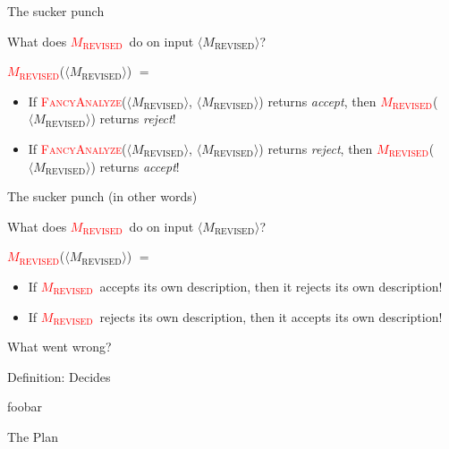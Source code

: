 \documentclass[12pt,compress]{beamer}
\newcommand{\func}[1]{\textcolor{red}{\textsc{#1}}}
\newcommand{\MREV}[0]{\func{$M_{\text{REVISED}}$}}
\newcommand{\strMREV}[0]{$\langle M_{\text{REVISED}} \rangle$}
\begin{document}
\begin{frame}{The sucker punch}

  What does \MREV~do on input \strMREV?

  \vskip 0.25in

  \MREV(\strMREV) $=$

  \begin{itemize}

  \item If \func{FancyAnalyze}(\strMREV, \strMREV) returns \textit{accept}, then
    \MREV(\strMREV) returns \textit{reject}!

  \item If \func{FancyAnalyze}(\strMREV, \strMREV) returns \textit{reject}, then
    \MREV(\strMREV) returns \textit{accept}!

  \end{itemize}

\end{frame}

\begin{frame}{The sucker punch (in other words)}

  What does \MREV~do on input \strMREV?

  \vskip 0.25in

  \MREV(\strMREV) $=$

  \begin{itemize}

  \item If \MREV~accepts its own description, then it rejects its own
    description!

  \item If \MREV~rejects its own description, then it accepts its own
    description!

  \end{itemize}

\end{frame}

\begin{frame}{What went wrong?}

  

\end{frame}

\begin{frame}{Definition: Decides}

  foobar

\end{frame}

\begin{frame}{The Plan}

  

\end{frame}
\end{document}
